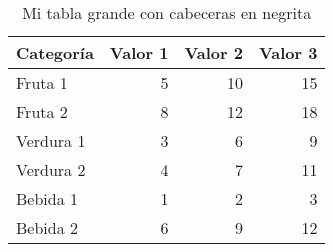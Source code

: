 \begin{table}[htbp!] %
\centering %
\caption[Tabla grande]{Mi tabla grande con cabeceras en negrita}
\label{tab:mi-tabla-grande} %

\begin{tabular}{@{}lrrr@{}}
\toprule
\textbf{Categoría} & \textbf{Valor 1} & \textbf{Valor 2} & \textbf{Valor 3} \\ \midrule
Fruta 1 & 5 & 10 & 15 \\
Fruta 2 & 8 & 12 & 18 \\
Verdura 1 & 3 & 6 & 9 \\
Verdura 2 & 4 & 7 & 11 \\
Bebida 1 & 1 & 2 & 3 \\
Bebida 2 & 6 & 9 & 12 \\ \bottomrule
\end{tabular}
\end{table}

